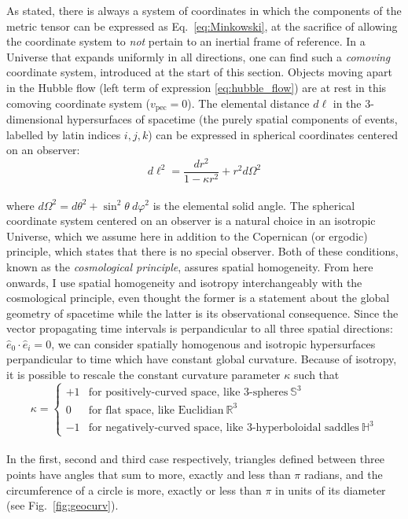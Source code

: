 As stated, there is always a system of coordinates in which the components of the metric tensor can be expressed as Eq.~\ref{eq:Minkowski}, at the sacrifice of allowing the coordinate system to \emph{not} pertain to an inertial frame of reference. In a Universe that expands uniformly in all directions, one can find such a \emph{comoving} coordinate system, introduced at the start of this section. Objects moving apart in the Hubble flow (left term of expression \ref{eq:hubble_flow}) are at rest in this comoving coordinate system ($v_{\mathrm{pec}}=0$). The elemental distance $d\ell$ in the 3-dimensional hypersurfaces of spacetime (the purely spatial components of events, labelled by latin indices $i, j, k$) can be expressed in spherical coordinates centered on an observer:
\begin{equation}
\label{def:dell}
d\ell^2 = \frac{dr^2}{1-\kappa r^2} + r^2 d\Omega^2
\end{equation} \\ where $d\Omega^2 = d\theta^2 + \sin^2 \theta ~d\varphi^2$ is the elemental solid angle. The spherical coordinate system centered on an observer is a natural choice in an isotropic Universe, which we assume here in addition to the Copernican (or ergodic) principle, which states that there is no special observer. Both of these conditions, known as the \emph{cosmological principle}, assures spatial homogeneity. From here onwards, I use spatial homogeneity and isotropy  interchangeably with the cosmological principle, even thought the former is a statement about the global geometry of spacetime while the latter is its observational consequence. Since the vector propagating time intervals is perpandicular to all three spatial directions: $\hat{e}_0 \cdot \hat{e}_i = 0$, we can consider spatially homogenous and isotropic hypersurfaces perpandicular to time which have constant global curvature. Because of isotropy, it is possible to rescale the constant curvature parameter $\kappa$ such that \\
\begin{equation}
\kappa = \left\{
\begin{array}{rl}
+1 & \text{for positively-curved space, like 3-spheres}~ \mathbb{S}^3\\
0 & \text{for flat space, like Euclidian}~ \mathbb{R}^3\\
-1 & \text{for negatively-curved space, like 3-hyperboloidal saddles}~ \mathbb{H}^3
\end{array}
\right.
\end{equation} \\
In the first, second and third case respectively, triangles defined between three points have angles that sum to more, exactly and less than $\pi$ radians, and the circumference of a circle is more, exactly or less than $\pi$ in units of its diameter (see Fig.~\ref{fig:geocurv}). \\

